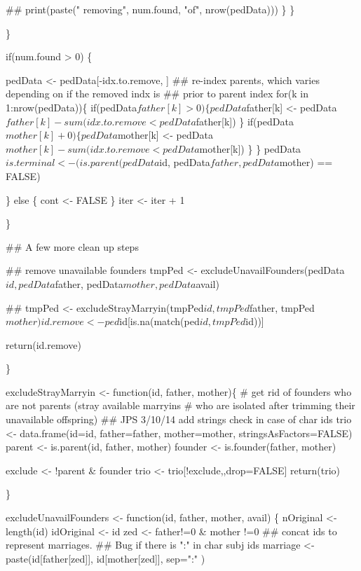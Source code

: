 \documentclass{article}
\begin{document}
\begin{enumerate}
                ## print(paste("  removing", num.found, "of", nrow(pedData)))
              \}
          \}
       
      \}

    if(num.found > 0) \{

      pedData <- pedData[-idx.to.remove, ]
      ## re-index parents, which varies depending on if the removed indx is
      ## prior to parent index
      for(k in 1:nrow(pedData))\{
        if(pedData$father[k] > 0) \{
          pedData$father[k] <- pedData$father[k] -
              sum(idx.to.remove < pedData$father[k])
        \}
        if(pedData$mother[k]+0) \{
          pedData$mother[k] <- pedData$mother[k] -
              sum(idx.to.remove < pedData$mother[k])
        \}
      \}
      pedData$is.terminal <-
        (is.parent(pedData$id, pedData$father, pedData$mother) == FALSE)
      
    \}
    else \{
      cont <- FALSE
    \}
    iter <- iter + 1   
    
  \}
  
  ## A few more clean up steps

  ## remove unavailable founders
  tmpPed <- excludeUnavailFounders(pedData$id, 
                        pedData$father, pedData$mother, pedData$avail)

  ## 
  tmpPed <- excludeStrayMarryin(tmpPed$id, tmpPed$father, tmpPed$mother)

  
  id.remove <- ped$id[is.na(match(ped$id, tmpPed$id))]

  return(id.remove)
  
\}


excludeStrayMarryin <- function(id, father, mother)\{
  # get rid of founders who are not parents (stray available marryins
  # who are isolated after trimming their unavailable offspring)
  ## JPS 3/10/14 add strings check in case of char ids
  trio <- data.frame(id=id, father=father, mother=mother, stringsAsFactors=FALSE)
  parent <- is.parent(id, father, mother)
  founder <- is.founder(father, mother)

  exclude <- !parent & founder
  trio <- trio[!exclude,,drop=FALSE]
  return(trio)

\}

excludeUnavailFounders <- function(id, father, mother, avail)
  \{
    nOriginal <- length(id)
    idOriginal <- id   
    zed <- father!=0 & mother !=0
    ## concat ids to represent marriages. 
    ## Bug if there is ":" in char subj ids
    marriage <- paste(id[father[zed]], id[mother[zed]], sep=":" )


\end{enumerate}
\end{document}
